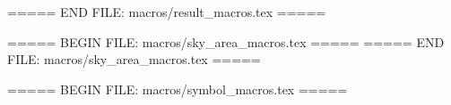 \newcommand{\RTADSEG}{\reviewed{\ensuremath{1}}}
\newcommand{\RTADFebstatH}{\reviewed{\ensuremath{1.07}}}
\newcommand{\RTADFebpH}{\reviewed{\ensuremath{0.98}}}


\newcommand{\gwSepSNRround}{\reviewed{\ensuremath{32}}}
\newcommand{\gwFebSNRround}{\reviewed{\ensuremath{69}}}


\newcommand{\gwFebVol}{\reviewed{\ensuremath{5\times 10^4}}}
\newcommand{\gwFebVolLV}{\reviewed{\ensuremath{2\times 10^6}}}
\newcommand{\gwSeptVolLV}{\reviewed{\ensuremath{1\times 10^7}}}
\newcommand{\gwSeptVolHLV}{\reviewed{\ensuremath{2\times 10^5}}}
\newcommand{\gwAugVol}{\reviewed{\ensuremath{5\times 10^4}}}
\newcommand{\gwFebGLADEfraction}{\reviewed{\ensuremath{74\%}}}
===== END FILE: macros/result_macros.tex =====

===== BEGIN FILE: macros/sky_area_macros.tex =====
\newcommand{\skyarea}[1]{\IfEqCase{#1}{{GW240925_combinedPHM_nocalC00}{22}{GW240925_combinedPHM_flatcalC00}{60}{GW240925_combinedPHM_envcalC00}{29}{GW240925_combinedPHM_envcalC01}{25}{GW250207_combinedPHM_nocal}{5}{GW250207_combinedPHM_cal}{20}{GW250207_combinedPHM_H1cal}{24047}{GW250207_0}{19}{GW250207_4}{33}{GW250207_5}{4}{GW250207_9}{7}}}
===== END FILE: macros/sky_area_macros.tex =====

===== BEGIN FILE: macros/symbol_macros.tex =====












\newcommand{\Msun}{\ensuremath{\mathit{M_\odot}}}
\newcommand\Mpcyr{\ensuremath{\mathrm{Mpc}^{3}\,\mathrm{yr}}}
\newcommand\Gpcyr{\ensuremath{\mathrm{Gpc}^{3}\,\mathrm{yr}}}
\newcommand\perMpcyr{\ensuremath{\mathrm{Mpc}^{-3}\,\mathrm{yr}^{-1}}}
\newcommand\perGpcyr{\ensuremath{\mathrm{Gpc}^{-3}\,\mathrm{yr}^{-1}}}







\newcommand{\datasymbol}{\ensuremath{d}}
\newcommand{\datacorrectedsymbol}{\ensuremath{\datasymbol^{\mathrm{(corr)}}}}
\newcommand{\waveformsymbol}{\ensuremath{h}}
\newcommand{\MLwaveformsymbol}{\ensuremath{\waveformsymbol_\mathrm{ML}}}
\newcommand{\noisesymbol}{\ensuremath{n}}
\newcommand{\noisecorrectedsymbol}{\ensuremath{\noisesymbol^{\mathrm{(corr)}}}}


\newcommand{\DLfree}{\Delta L_\mathrm{free}}
\newcommand{\DLres}{\Delta L_\mathrm{res}}
\newcommand{\DLctrl}{\Delta L_\mathrm{ctrl}}
\newcommand{\derr}{d_\mathrm{err}}
\newcommand{\dctrl}{d_\mathrm{ctrl}}
\newcommand{\Rmodel}{R^\mathrm{(model)}}
\newcommand{\CorrectionFactor}{\eta}

